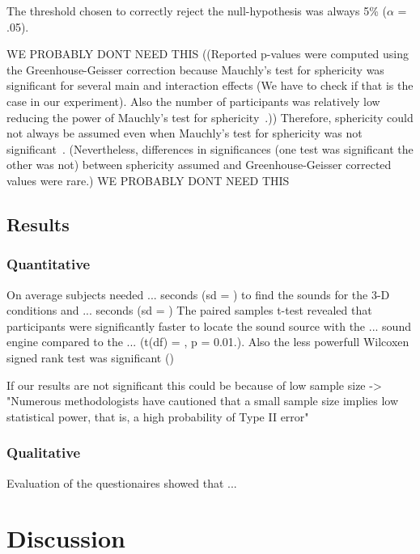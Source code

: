 \documentclass[journal]{IEEEtran}
\begin{document}
The threshold chosen to correctly reject the null-hypothesis was always 5\% ($\alpha$ = .05). 

WE PROBABLY DONT NEED THIS 
((Reported p-values were computed using the Greenhouse-Geisser correction because Mauchly's test for sphericity was significant for several main and interaction effects (We have to check if that is the case in our experiment). Also the number of participants was relatively low reducing the power of Mauchly's test for sphericity~\cite[p. 72]{Rasch2014}.)) Therefore, sphericity could not always be assumed even when Mauchly's test for sphericity was not significant~\cite[p. 72]{Rasch2014}. (Nevertheless, differences in significances (one test was significant the other was not) between sphericity assumed and Greenhouse-Geisser corrected values were rare.) 
WE PROBABLY DONT NEED THIS 

\subsection{Results}
\subsubsection{Quantitative}

On average subjects needed ... seconds (sd = ) to find the sounds for the 3-D conditions and ... seconds (sd = ) 
The paired samples t-test revealed that participants were significantly faster to locate the sound source with the ... sound engine compared to the ... (t(df) = , p = 0.01.). Also the less powerfull Wilcoxen signed rank test was significant () 

If our results are not significant this could be because of low sample size -> "Numerous methodologists have 
cautioned that a small sample size implies low statistical 
power, that is, a high probability of Type II error"~\cite{DeWinter2013}

\subsubsection{Qualitative}

Evaluation of the questionaires showed that ...



\section{Discussion}
\end{document}

